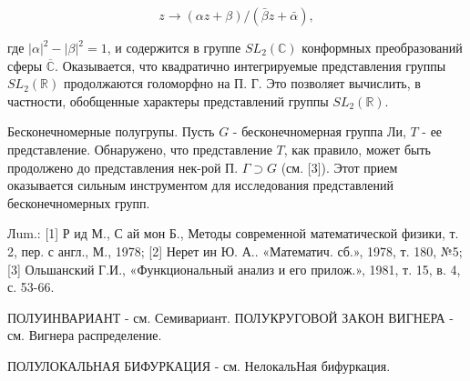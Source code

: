 \documentclass[10pt]{article}
\begin{document}
\[

z \rightarrow(\alpha z+\beta) /(\bar{\beta} z+\bar{\alpha}),

\]



где $|\alpha|^{2}-|\beta|^{2}=1$, и содержится в группе $S L_{2}(\mathbb{C})$ конформных преобразований сферы $\overline{\mathbb{C}}$. Оказывается, что квадратично интегрируемые представления группы $S L_{2}(\mathbb{R})$ продолжаются голоморфно на П. Г. Это позволяет вычислить, в частности, обобщенные характеры представлений группы $S L_{2}(\mathbb{R})$.



Бесконечномерные полугрупы. Пусть $G$ - бесконечномерная группа Ли, $T$ - ее представление. Обнаружено, что представление $T$, как правило, может быть продолжено до представления нек-рой П. $\Gamma \supset G$ (см. [3]). Этот прием оказывается сильным инструментом для исследования представлений бесконечномерных групп.



Лum.: [1] Р ид М., С ай мон Б., Методы современной математической физики, т. 2, пер. с англ., М., 1978; [2] Нерет ин Ю. А.. «Математич. сб.», 1978, т. 180, №5; [3] Ольшанский Г.И., «Функциональный анализ и его прилож.», 1981, т. 15, в. 4, с. 53-66.



ПОЛУИНВАРИАНТ - см. Семивариант. ПОЛУКРУГОВОЙ ЗАКОН ВИГНЕРА - см. Вигнера распределение.



ПОЛУЛОКАЛЬНАЯ БИФУРКАЦИЯ - см. НелокальНая бифуркация.
\end{document}
